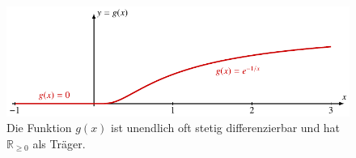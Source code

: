 %
%
%
\begin{figure}
\centering
\includegraphics{chapters/030-kurvenintegral/images/e1x.pdf}
\caption{Die Funktion $g(x)$ ist unendlich oft stetig differenzierbar
und hat $\mathbb{R}_{\ge 0}$ als Träger.
\label{buch:kurvenintegral:fig:e1x}}
\end{figure}
